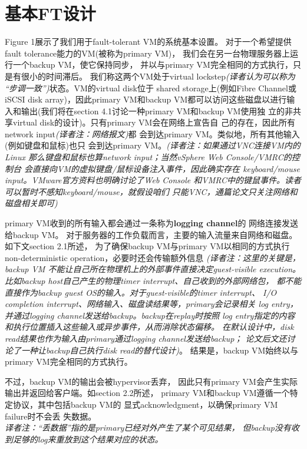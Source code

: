 \section{基本FT设计}

\insertfigureone

Figure 1展示了我们用于fault-tolerant VM的系统基本设置。%
对于一个希望提供fault tolerance能力的VM(被称为primary VM)，%
我们会在另一台物理服务器上运行一个backup VM，使它保持同步，%
并以与primary VM完全相同的方式执行，只是有很小的时间滞后。%
我们称这两个VM处于virtual lockstep\emph{(译者认为可以称为%
“步调一致”)}状态。VM的virtual disk位于%
shared storage上(例如Fibre Channel或iSCSI disk %
array)，因此primary VM和backup VM都可以访问这些磁盘以进行输%
入和输出(我们将在section 4.1讨论一种primary VM和backup VM使用独%
立的非共享virtual disk的设计)。只有primary VM会在网络上宣告自%
己的存在，因此所有network input\emph{(译者注：网络报文)}都%
会到达primary VM。类似地，所有其他输入(例如键盘和鼠标)也只%
会到达primary VM。\emph{(译者注：如果通过VNC连接VM内的Linux%
那么键盘和鼠标也算network input；当然vSphere Web Console/VMRC的控制台%
会直接向VM的虚拟键盘/鼠标设备注入事件，因此确实存在%
keyboard/mouse input。VMware官方资料也明确讨论了Web Console%
和VMRC中的键鼠事件。读者可以暂时不感知keyboard/mouse，就假设咱们%
只能VNC，通篇论文只关注网络和磁盘相关即可)}%

primary VM收到的所有输入都会通过一条称为\textbf{logging channel}的%
网络连接发送给backup VM。%
对于服务器的工作负载而言，主要的输入流量来自网络和磁盘。如下文section 2.1所述，%
为了确保backup VM与primary VM以相同的方式执行%
non-deterministic operation，必要时还会传输额外信息
\emph{(译者注：这里的关键是，backup VM%
不能让自己所在物理机上的外部事件直接决定guest-visible execution。%
比如backup host自己产生的物理timer interrupt、自己收到的外部网络包，%
都不能直接作为backup guest OS的输入。对于guest-visible的timer interrupt、%
I/O completion interrupt、网络输入、磁盘读结果等，primary会记录相关%
log entry，并通过logging channel发送给backup。backup在replay时按照%
log entry指定的内容和执行位置插入这些输入或异步事件，从而消除状态偏移。%
在默认设计中，disk read结果也作为输入由primary通过logging channel发送给backup；%
论文后文还讨论了一种让backup自己执行disk read的替代设计)}。%
结果是，backup VM始终以与primary VM完全相同的方式执行。%

不过，backup VM的输出会被hypervisor丢弃，%
因此只有primary VM会产生实际输出并返回给客户端。如section 2.2所述，%
primary VM和backup VM遵循一个特定协议，其中包括backup VM的%
显式acknowledgment，以确保primary VM failure时不会丢%
失数据。%
\\\emph{译者注：“丢数据”指的是primary已经对外产生了某个可见结果，%
但backup没有收到足够的log来重放到这个结果对应的状态。}%

